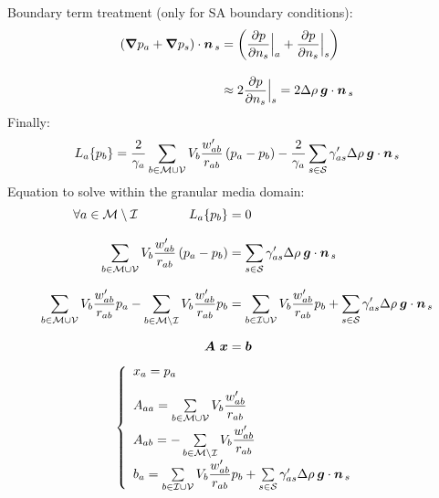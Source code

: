 \documentclass{../GPUSPHtemplate}
\begin{document}
%
Boundary term treatment (only for SA boundary conditions):
\begin{align*}
 \left( \bm{\nabla} p_a + \bm{\nabla} p_s \right) \cdot \bm{n}_{\,s}
&=  \left( \dfrac{\partial p}{\partial n_s}\Bigr|_a + \dfrac{\partial p}{\partial n_s}\Bigr|_s \right) \\[0.9em]
&\approx 2 \dfrac{\partial p}{\partial n_s}\Bigr|_s = 2 \Delta \rho \: \bm{g} \cdot \bm{n}_{\,s}
\end{align*}
%
Finally:
%
\begin{equation*}
L_a\{p_b\} = 
\dfrac{2}{\gamma_a}\sum\limits_{b\in \mathcal{M} \cup \mathcal{V}} V_b \dfrac{w_{ab}'}{r_{ab}}  \left(p_a - p_b\right)
- \dfrac{2}{\gamma_a}\sum\limits_{s\in \mathcal{S}} \gamma_{as}' \Delta \rho \: \bm{g} \cdot \bm{n}_{\,s}
\end{equation*}
Equation to solve within the granular media domain:
%
\begin{align*}
\forall a \in \mathcal{M}\setminus \mathcal{I} \qquad \qquad
L_a\{p_b\} &= 0 \\[0.8em]
\sum\limits_{b\in \mathcal{M} \cup \mathcal{V}} V_b \dfrac{w_{ab}'}{r_{ab}} \left( p_a - p_b \right)
&= \sum\limits_{s\in \mathcal{S}} \gamma_{as}' \Delta \rho \: \bm{g} \cdot \bm{n}_{\,s} \\[0.8em]
\sum\limits_{b\in \mathcal{M} \cup \mathcal{V}} V_b \dfrac{w_{ab}'}{r_{ab}} p_a
-\sum\limits_{b\in \mathcal{M} \setminus \mathcal{I}} V_b \dfrac{w_{ab}'}{r_{ab}} p_b &=
\sum\limits_{b \in \mathcal{I} \cup \mathcal{V}} V_b \dfrac{w_{ab}'}{r_{ab}} p_b +
\sum\limits_{s\in \mathcal{S}} \gamma_{as}' \Delta \rho \: \bm{g} \cdot \bm{n}_{\,s} \\[0.6em]
\bm{\bm{A}}\, \,\bm{x} & = \bm{b}
\end{align*}
%
\[ \left\lbrace
\begin{array}{l}
x_a = p_a \\[0.9em]
A_{aa} = \sum\limits_{b\in \mathcal{M} \cup \mathcal{V}} V_b \dfrac{w_{ab}'}{r_{ab}} \\[0.9em]
A_{ab} = -\sum\limits_{b\in \mathcal{M} \setminus \mathcal{I}} V_b \dfrac{w_{ab}'}{r_{ab}} \\[0.9em]
b_a = \sum\limits_{b \in \mathcal{I} \cup \mathcal{V}} V_b \dfrac{w_{ab}'}{r_{ab}} p_b + \sum\limits_{s\in \mathcal{S}} \gamma_{as}' \Delta \rho \: \bm{g} \cdot \bm{n}_{\,s}
\end{array} \right. \]
\end{document}
